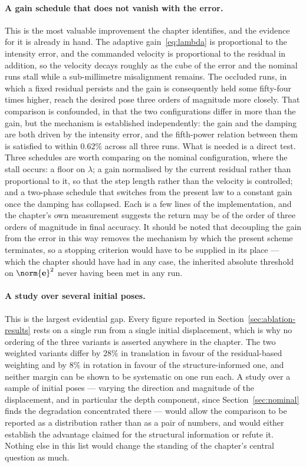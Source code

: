 \paragraph{A gain schedule that does not vanish with the error.}
This is the most valuable improvement the chapter identifies, and the evidence
for it is already in hand. The adaptive gain~\eqref{eq:lambda} is proportional
to the intensity error, and the commanded velocity is proportional to the
residual in addition, so the velocity decays roughly as the cube of the error
and the nominal runs stall while a sub-millimetre misalignment remains. The
occluded runs, in which a fixed residual persists and the gain is consequently
held some fifty-four times higher, reach the desired pose three orders of
magnitude more closely. That comparison is confounded, in that the two
configurations differ in more than the gain, but the mechanism is established
independently: the gain and the damping are both driven by the intensity
error, and the fifth-power relation between them is satisfied to within
$0.62\%$ across all three runs. What is needed is a direct test. Three
schedules are worth comparing on the nominal configuration, where the stall
occurs: a floor on $\lambda$; a gain normalised by the current residual rather
than proportional to it, so that the step length rather than the velocity is
controlled; and a two-phase schedule that switches from the present law to a
constant gain once the damping has collapsed. Each is a few lines of the
implementation, and the chapter's own measurement suggests the return may be
of the order of three orders of magnitude in final accuracy. It should be
noted that decoupling the gain from the error in this way removes the
mechanism by which the present scheme terminates, so a stopping criterion
would have to be supplied in its place --- which the chapter should have had
in any case, the inherited absolute threshold on $\norm{\mathbf{e}}^{2}$ never
having been met in any run.

\paragraph{A study over several initial poses.}
This is the largest evidential gap. Every figure reported in
Section~\ref{sec:ablation-results} rests on a single run from a single initial
displacement, which is why no ordering of the three variants is asserted
anywhere in the chapter. The two weighted variants differ by $28\%$ in
translation in favour of the residual-based weighting and by $8\%$ in rotation
in favour of the structure-informed one, and neither margin can be shown to be
systematic on one run each. A study over a sample of initial poses --- varying
the direction and magnitude of the displacement, and in particular the depth
component, since Section~\ref{sec:nominal} finds the degradation concentrated
there --- would allow the comparison to be reported as a distribution rather
than as a pair of numbers, and would either establish the advantage claimed
for the structural information or refute it. Nothing else in this list would
change the standing of the chapter's central question as much.

